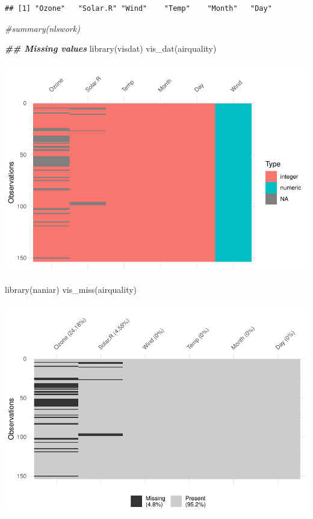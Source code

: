 \documentclass[
  12pt,
]{article}
\newenvironment{Shaded}{\begin{snugshade}}{\end{snugshade}}
\newcommand{\CommentTok}[1]{\textcolor[rgb]{0.56,0.35,0.01}{\textit{#1}}}
\newcommand{\DocumentationTok}[1]{\textcolor[rgb]{0.56,0.35,0.01}{\textbf{\textit{#1}}}}
\newcommand{\FunctionTok}[1]{\textcolor[rgb]{0.00,0.00,0.00}{#1}}
\newcommand{\NormalTok}[1]{#1}
\begin{document}
\begin{verbatim}
## [1] "Ozone"   "Solar.R" "Wind"    "Temp"    "Month"   "Day"
\end{verbatim}

\begin{Shaded}
\begin{Highlighting}[]
\CommentTok{\#summary(nlswork)}

\DocumentationTok{\#\# Missing values}
\FunctionTok{library}\NormalTok{(visdat)}
\FunctionTok{vis\_dat}\NormalTok{(airquality)}
\end{Highlighting}
\end{Shaded}

\includegraphics{articleCustomerDropoutMembership_files/figure-latex/Stats1-1.pdf}

\begin{Shaded}
\begin{Highlighting}[]
\FunctionTok{library}\NormalTok{(naniar)}
\FunctionTok{vis\_miss}\NormalTok{(airquality)}
\end{Highlighting}
\end{Shaded}

\includegraphics{articleCustomerDropoutMembership_files/figure-latex/Stats1-2.pdf}
\end{document}
